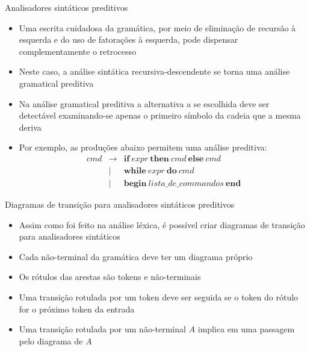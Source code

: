 \begin{frame}[fragile]{Analisadores sintáticos preditivos}

    \begin{itemize}
        \item Uma escrita cuidadosa da gramática, por meio de eliminação de recursão à esquerda e do uso de fatorações à esquerda, pode dispensar complementamente
            o retrocesso

        \item Neste caso, a análise sintática recursiva-descendente se torna uma análise gramatical preditiva

        \item Na análise gramatical preditiva a alternativa a se escolhida deve ser detectável examinando-se apenas o primeiro símbolo da cadeia que a mesma
            deriva

        \item Por exemplo, as produções abaixo permitem uma análise preditiva:
        \[
            \begin{array}{rcl}
                cmd & \to & \textbf{if}\ expr\ \textbf{then}\ cmd\ \textbf{else}\ cmd \\
                & | & \textbf{while}\ expr\ \textbf{do}\ cmd \\
                & | & \textbf{begin}\ lista\_de\_commandos \ \textbf{end}
            \end{array}
        \]
    \end{itemize}

\end{frame}

\begin{frame}[fragile]{Diagramas de transição para analisadores sintáticos preditivos}

    \begin{itemize}
        \item Assim como foi feito na análise léxica, é possível criar diagramas de transição para analisadores sintáticos

        \item Cada não-terminal da gramática deve ter um diagrama próprio

        \item Os rótulos das arestas são tokens e não-terminais

        \item Uma transição rotulada por um token deve ser seguida se o token do rótulo for o próximo token da entrada

        \item Uma transição rotulada por um não-terminal $A$ implica em uma passagem pelo diagrama de $A$
    \end{itemize}

\end{frame}

